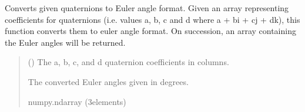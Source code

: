\documentclass[letterpaper,10pt,english]{sphinxmanual}
\begin{document}
\begin{fulllineitems}
\label{\detokenize{modules/util/transformations:qnav.util.transformations.quaternion_to_euler}}
\pysigstartsignatures
{}
\pysigstopsignatures
\sphinxAtStartPar
Converts given quaternions to Euler angle format.
Given an array representing coefficients for quaternions (i.e.
values a, b, c and d where a + bi + cj + dk), this function converts them
to euler angle format. On succession, an array containing the Euler angles
will be returned.
\begin{quote}\begin{description}
\sphinxAtStartPar
{} (\sphinxstyleliteralemphasis{\sphinxupquote{ (}}\sphinxstyleliteralemphasis{\sphinxupquote{)}}) \textendash{} The a, b, c, and d quaternion coefficients in columns.

\sphinxAtStartPar
The converted Euler angles given in degrees.

\sphinxAtStartPar
numpy.ndarray (3\sphinxhyphen{}elements)

\end{description}\end{quote}

\end{fulllineitems}

\end{document}
